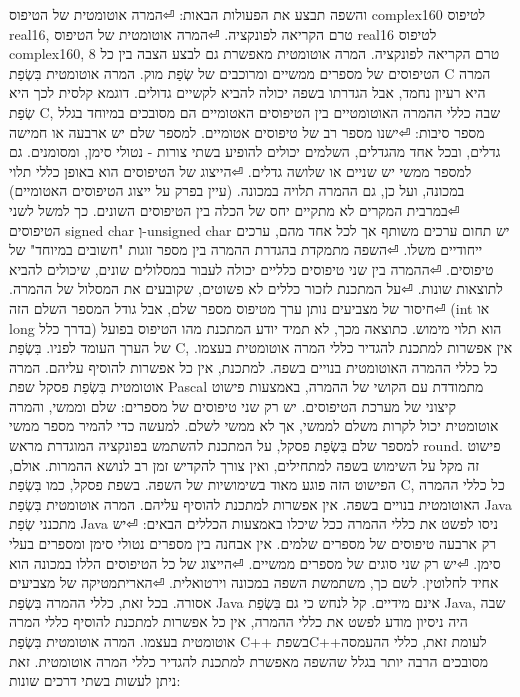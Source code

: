 \begin{טבלא}[!htbp]
      והשפה תבצע את הפעולות הבאות:
⏎המרה אוטומטית של הטיפוס complex160 לטיפוס real16, טרם הקריאה לפונקציה.
⏎המרה אוטומטית של הטיפוס real16 לטיפוס complex160, טרם הקריאה לפונקציה.
      המרה אוטומטית מאפשרת גם לבצע הצבה בין כל 8 הטיפוסים של מספרים ממשיים ומרוכבים של שְׂפַת מוק.
      המרה אוטומטית בִּשְׂפַת C
      המרה היא רעיון נחמד, אבל הגדרתו בשפה יכולה להביא לקשיים גדולים. דוגמא קלסית לכך היא שְׂפַת C, שבה כללי ההמרה האוטומטיים בין הטיפוסים האטומיים הם מסובכים במיוחד בגלל מספר סיבות:
⏎ישנו מספר רב של טיפוסים אטומיים. למספר שלם יש ארבעה או חמישה גדלים, ובכל אחד מהגדלים, השלמים יכולים להופיע בשתי צורות - נטולי סימן, ומסומנים. גם למספר ממשי יש שניים או שלושה גדלים.
⏎הייצוג של הטיפוסים הוא באופן כללי תלוי במכונה, ועל כן, גם ההמרה תלויה במכונה. (עיין בפרק על ייצוג הטיפוסים האטומיים)
⏎במרבית המקרים לא מתקיים יחס של הכלה בין הטיפוסים השונים. כך למשל לשני הטיפוסים signed char וְ-unsigned char יש תחום ערכים משותף אך לכל אחד מהם, ערכים ייחודיים משלו.
⏎השפה מתמקדת בהגדרת ההמרה בין מספר זוגות "חשובים במיוחד" של טיפוסים.
⏎ההמרה בין שני טיפוסים כלליים יכולה לעבור במסלולים שונים, שיכולים להביא לתוצאות שונות.
⏎על המתכנת לזכור כללים לא פשוטים, שקובעים את המסלול של ההמרה.
⏎חיסור של מצביעים נותן ערך מטיפוס מספר שלם, אבל גודל המספר השלם הזה (int או long בדרך כלל) הוא תלוי מימוש. כתוצאה מכך, לא תמיד יודע המתכנת מהו הטיפוס בפועל של הערך העומד לפניו.
      בִּשְׂפַת C, אין אפשרות למתכנת להגדיר כללי המרה אוטומטית בעצמו. כל כללי ההמרה האוטומטית בנויים בשפה. למתכנת, אין כל אפשרות להוסיף עליהם.
      המרה אוטומטית בִּשְׂפַת פסקל
      שפת Pascal מתמודדת עם הקושי של ההמרה, באמצעות פישוט קיצוני של מערכת הטיפוסים. יש רק שני טיפוסים של מספרים: שלם וממשי, והמרה אוטומטית יכול לקרות משלם לממשי, אך לא ממשי לשלם. למעשה כדי להמיר מספר ממשי למספר שלם בִּשְׂפַת פסקל, על המתכנת להשתמש בפונקציה המוגדרת מראש round.
      פישוט זה מקל על השימוש בשפה למתחילים, ואין צורך להקדיש זמן רב לנושא ההמרות. אולם, הפישוט הזה פוגע מאוד בשימושיות של השפה.
      בשפת פסקל, כמו בִּשְׂפַת C, כל כללי ההמרה האוטומטית בנויים בשפה. אין אפשרות למתכנת להוסיף עליהם.
      המרה אוטומטית בִּשְׂפַת Java
      מתכנני שְׂפַת Java ניסו לפשט את כללי ההמרה ככל שיכלו באמצעות הכללים הבאים:
⏎יש רק ארבעה טיפוסים של מספרים שלמים. אין אבחנה בין מספרים נטולי סימן ומספרים בעלי סימן.
⏎יש רק שני סוגים של מספרים ממשיים.
⏎הייצוג של כל הטיפוסים הללו במכונה הוא אחיד לחלוטין. לשם כך, משתמשת השפה במכונה וירטואלית.
⏎האריתמטיקה של מצביעים אסורה.
      בכל זאת, כללי ההמרה בִּשְׂפַת Java אינם מידיים. קל לנחש כי גם בִּשְׂפַת Java, שבה היה ניסיון מודע לפשט את כללי ההמרה, אין כל אפשרות למתכנת להוסיף כללי המרה אוטומטית בעצמו.
      המרה אוטומטית בִּשְׂפַת C++
      בשפתC++לעומת זאת, כללי ההעמסה מסובכים הרבה יותר בגלל שהשפה מאפשרת למתכנת להגדיר כללי המרה אוטומטית. זאת ניתן לעשות בשתי דרכים שונות:


\end{טבלא}
